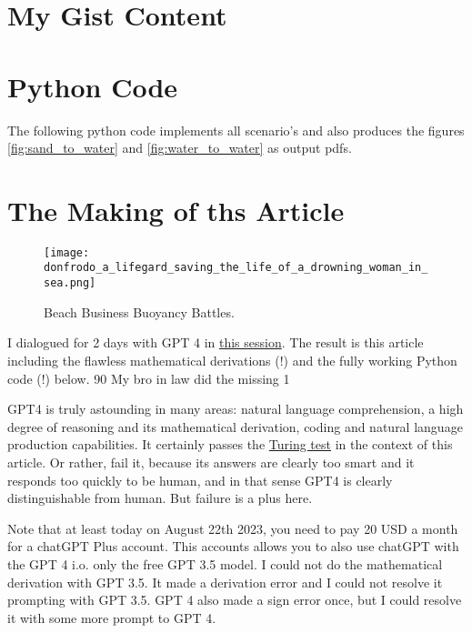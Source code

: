 \documentclass[11pt, a4paper]{article}
\begin{document}
\section*{My Gist Content}



\section{Python Code}

The following python code implements all scenario's and also produces the figures
\ref{fig:sand_to_water} and \ref{fig:water_to_water} as output pdfs.




\section{The Making of ths Article}

\begin{figure}[h]
\centering
\texttt{[image: donfrodo\_a\_lifegard\_saving\_the\_life\_of\_a\_drowning\_woman\_in\_sea.png]}
\caption{Beach Business Buoyancy Battles.}
\end{figure}

I dialogued for 2 days with GPT 4 in
\href{https://chat.openai.com/share/c61447ac-becd-4065-b7b5-c53f00248223}{this session}.
The result is this article including the flawless mathematical derivations (!)
and the fully working Python code (!) below. 90%
My bro in law did the missing 1%

GPT4 is truly astounding in many areas: natural language comprehension,
a high degree of reasoning and its mathematical derivation,
coding and natural language production capabilities. It certainly passes
the \href{https://en.wikipedia.org/wiki/Turing_test}{Turing test} in the context of this article.
Or rather, fail it, because its answers are clearly too smart and it responds too quickly to be human,
and in that sense GPT4 is clearly distinguishable from human. But failure is a plus here.

Note that at least today on August 22th 2023, you need to pay 20 USD a month for a chatGPT Plus account.
This accounts allows you to also use chatGPT with the GPT 4 i.o. only the free GPT 3.5 model.
I could not do the mathematical derivation with GPT 3.5. It made a derivation error and I could not resolve
it prompting with GPT 3.5. GPT 4 also made a sign error once, but I could resolve it with some more prompt to GPT 4.
\end{document}
